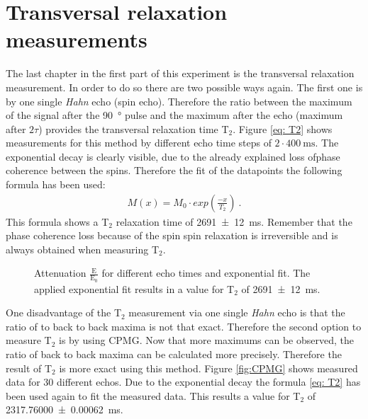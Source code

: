 \section{Transversal relaxation measurements}
\label{sec:Transversalrelaxationmeasurements}
The last chapter in the first part of this experiment is the transversal relaxation measurement. In order to do so there are two possible ways again.\newline
The first one is by one single \textit{Hahn} echo (spin echo). Therefore the ratio between the maximum of the signal after the \SI{90}{\degree} pulse and the maximum after the echo (maximum after $2\tau$) provides the transversal relaxation time T$_2$. Figure \ref{eq: T2} shows measurements for this method by different echo time steps of $2\cdot \SI{400}{\milli \second}$. The exponential decay is clearly visible, due to the already explained loss ofphase coherence between the spins. Therefore the fit of the datapoints the following formula has been used:
\begin{align}
    M(x)=M_0 \cdot exp(\frac{-x}{T_{2}}) \ .
    \label{eq: T2}
\end{align}
This formula shows a T$_2$ relaxation time of \SI{2691 \pm 12}{\milli \second}. Remember that the phase coherence loss because of the spin spin relaxation is irreversible and is always obtained when measuring T$_2$.

\begin{figure}[H]
    \centering
    
    \caption[Attenuation $\frac{\text{E}}{\text{E}_0}$ for different echo times and exponential fit.]{Attenuation $\frac{\text{E}}{\text{E}_0}$ for different echo times and exponential fit. The applied exponential fit results in a value for T$_2$ of \SI{2691 \pm 12}{\milli \second}.}
    \label{fig:T2}
\end{figure}

One disadvantage of the T$_2$ measurement via one single \textit{Hahn} echo is that the ratio of to back to back maxima is not that exact. Therefore the second option to measure T$_2$ is by using CPMG. Now that more maximums can be observed, the ratio of back to back maxima can be calculated more precisely. Therefore the result of T$_2$ is more exact using this method. Figure \ref{fig:CPMG} shows measured data for 30 different echos. Due to the exponential decay the formula \ref{eq: T2} has been used again to fit the measured data. This results a value for T$_2$ of \SI{2317.76000 \pm 0.00062}{\milli \second}. 

